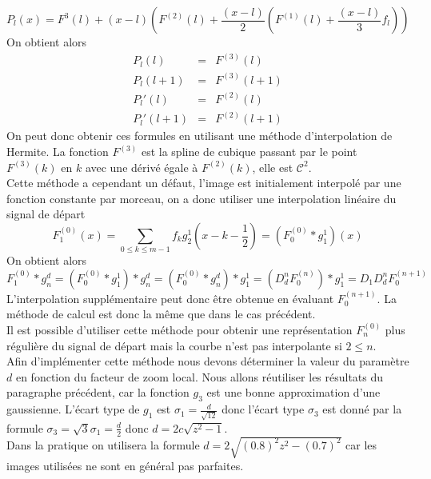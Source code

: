 \begin{equation*}
P_l (x)=F^{3}(l) +(x-l) \left(F^{(2)}(l)+ \frac{(x-l)}{2}\left(F^{(1)}(l)+\frac{(x-l)}{3} f_{l}\right)\right)
\end{equation*}
On obtient alors
\begin{eqnarray*}
P_l (l) &=& F^{(3)}(l) \\
P_l (l+1) &=& F^{(3)}(l+1) \\
P_l '(l) &=& F^{(2)}(l) \\
P_l '(l+1) &=& F^{(2)}(l+1)
\end{eqnarray*}
On peut donc obtenir ces formules en utilisant une méthode d'interpolation de Hermite. La fonction $F^{(3)}$ est la spline de cubique passant par le point $F^{(3)}(k)$ en $k$ avec une dérivé égale à $F^{(2)}(k)$, elle est $\mathcal{C}^2$.\\
Cette méthode a cependant un défaut, l'image est initialement interpolé par une fonction constante par morceau, on a donc utiliser une interpolation linéaire du signal de départ 
\begin{equation*}
F_1 ^{(0)}(x)=\underset{0\le k \le m-1}{\sum} f_k g_2^1 (x-k-\frac{1}{2})=(F_0^{(0)} *g_1^1 )(x)
\end{equation*}
On obtient alors 
\begin{equation*}
F_1 ^{(0)}*g_n^d=(F_0 ^{(0)}*g_1^1)*g_n^d=(F_0 ^{(0)}*g_n^d)*g_1^1=(D_d^n F_0 ^{(n)})*g_1^1=D_1 D_d^n F_0^{(n+1)}
\end{equation*}
L'interpolation supplémentaire peut donc être obtenue en évaluant $F_0^{(n+1)}$. La méthode de calcul est donc la même que dans le cas précédent.\\
Il est possible d'utiliser cette méthode pour obtenir une représentation $F_n^{(0)}$ plus régulière du signal de départ mais la courbe n'est pas  interpolante si $2\le n$.\\
Afin d'implémenter cette méthode nous devons déterminer la valeur du paramètre $d$ en fonction du facteur de zoom local. Nous allons réutiliser les résultats du paragraphe précédent, car la fonction $g_3$ est une bonne approximation d'une gaussienne. L'écart type de $g_1$ est $\sigma_1=\frac{d}{\sqrt{12}}$ donc l'écart type $\sigma_3$ est donné par la formule $\sigma_3=\sqrt{3}\sigma_1=\frac{d}{2}$
donc $d=2c\sqrt{z^2 - 1}$.\\
Dans la pratique on utilisera la formule $d=2\sqrt{(0.8)^2 z^2 - (0.7)^2}$ car les images utilisées ne sont en général pas parfaites.\\


